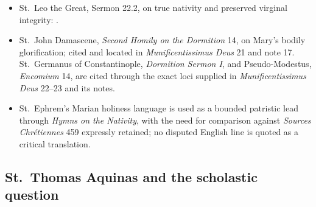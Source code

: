 \begin{itemize}
  \item St.~Leo the Great, Sermon 22.2, on true nativity and preserved virginal integrity: .
  \item St.~John Damascene, \emph{Second Homily on the Dormition} 14, on Mary's bodily glorification; cited and located in \emph{Munificentissimus Deus} 21 and note 17. St.~Germanus of Constantinople, \emph{Dormition Sermon I}, and Pseudo-Modestus, \emph{Encomium} 14, are cited through the exact loci supplied in \emph{Munificentissimus Deus} 22--23 and its notes.
  \item St.~Ephrem's Marian holiness language is used as a bounded patristic lead through \emph{Hymns on the Nativity}, with the need for comparison against \emph{Sources Chr\'etiennes} 459 expressly retained; no disputed English line is quoted as a critical translation.
\end{itemize}

\subsection{St.~Thomas Aquinas and the scholastic question}

